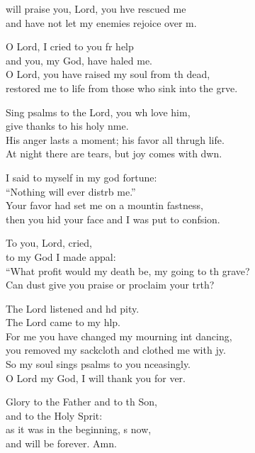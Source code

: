 \settowidth{\versewidth}{“What profit would my death be, my going to the grave? *}
\begin{psalmverse}%
  \begin{patverse}
 will praise you, Lord, you hve rescued me\Med\\
and have not let my enemies rejoice over m.

O Lord, I cried to you fr help\Med\\
and you, my God, have haled me.\\
O Lord, you have raised my soul from th dead,\Med\\
restored me to life from those who sink into the grve.

Sing psalms to the Lord, you wh love him,\Med\\
give thanks to his holy nme.\\
His anger lasts a moment; his favor all thrugh life.\Med\\
At night there are tears, but joy comes with dwn.

I said to myself in my god fortune:\Med\\
“Nothing will ever distrb me.”\\
Your favor had set me on a mountin fastness,\Med\\
then you hid your face and I was put to confsion.

To you, Lord,  cried,\Med\\
to my God I made appal:\\
“What profit would my death be, my going to th grave?\Med\\
Can dust give you praise or proclaim your trth?

The Lord listened and hd pity.\Med\\
The Lord came to my hlp.\\
For me you have changed my mourning int dancing,\Med\\
you removed my sackcloth and clothed me with jy.\\
So my soul sings psalms to you nceasingly.\Med\\
O Lord my God, I will thank you for ver.

Glory to the Father and to th Son,\Med\\
and to the Holy Sp\pointup{\i}rit:\\
as it was in the beginning, \pointup{\i}s now,\Med\\
and will be forever. Amn. 
  \end{patverse}
\end{psalmverse}
